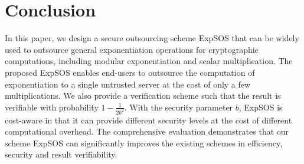 \documentclass[english,draftcls,onecolumn,11pt]{IEEEtran}
\theoremstyle{definition}
\theoremstyle{plain}
\theoremstyle{plain}
\theoremstyle{definition}
\begin{document}
\section{Conclusion\label{sec:Conclusion}}

In this paper, we design a secure outsourcing scheme ExpSOS that can
be widely used to outsource general exponentiation operations for
cryptographic computations, including modular exponentiation and scalar
multiplication. The proposed ExpSOS enables end-users to outsource
the computation of exponentiation to a single untrusted server at
the cost of only a few multiplications. We also provide a verification
scheme such that the result is verifiable with probability $1-\frac{1}{2b^{2}}$.
With the security parameter $b$, ExpSOS is cost-aware in that it
can provide different security levels at the cost of different computational
overhead. The comprehensive evaluation demonstrates that our scheme
ExpSOS can significantly improves the existing schemes in efficiency,
security and result verifiability.
\end{document}
